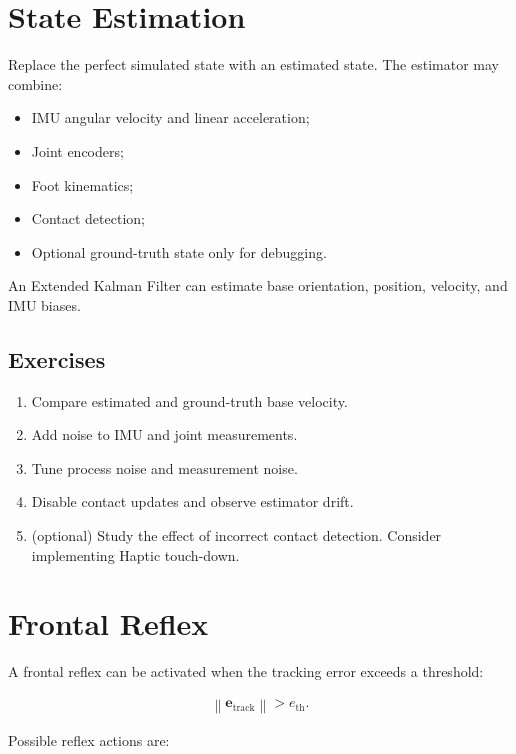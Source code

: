 \documentclass[11pt,a4paper]{article}
\begin{document}
\section{State Estimation}

Replace the perfect simulated state with an estimated state. The estimator may combine:

\begin{itemize}
    \item IMU angular velocity and linear acceleration;
    \item Joint encoders;
    \item Foot kinematics;
    \item Contact detection;
    \item Optional ground-truth state only for debugging.
\end{itemize}

An Extended Kalman Filter can estimate base orientation, position, velocity, and IMU biases.

\subsection*{Exercises}

\begin{enumerate}[label=\arabic*.]
    \item Compare estimated and ground-truth base velocity.
    \item Add noise to IMU and joint measurements.
    \item Tune process noise and measurement noise.
    \item Disable contact updates and observe estimator drift.
    \item (optional) Study the effect of incorrect contact detection. Consider implementing Haptic touch-down.
\end{enumerate}

\section{Frontal Reflex}

A frontal reflex can be activated when the tracking error exceeds a threshold:

\begin{align*}
\left\|
\bm{e}_{\mathrm{track}}
\right\|
>
e_{\mathrm{th}}.
\end{align*}

Possible reflex actions are:

 
\end{document}

